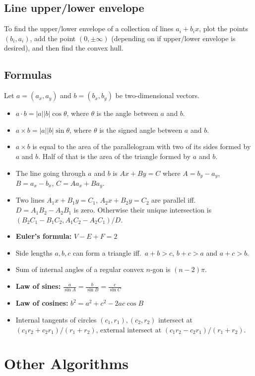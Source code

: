 \documentclass[8pt,a4paper,landscape,oneside]{amsart}
\begin{document}
\begin{multicols*}{3}
  \subsection{Line upper/lower envelope}
    To find the upper/lower envelope of a collection of lines $a_i+b_i x$,
    plot the points $(b_i,a_i)$, add the point $(0,\pm \infty)$ (depending
    on if upper/lower envelope is desired), and then find the convex hull.
  \subsection{Formulas}
    Let $a = (a_x, a_y)$ and $b = (b_x, b_y)$ be two-dimensional vectors.
    \begin{itemize}
      \item $a\cdot b = |a||b|\cos{\theta}$, where $\theta$ is the angle
        between $a$ and $b$.
      \item $a\times b = |a||b|\sin{\theta}$, where $\theta$ is the
        signed angle between $a$ and $b$.
      \item $a\times b$ is equal to the area of the parallelogram with
        two of its sides formed by $a$ and $b$. Half of that is the
        area of the triangle formed by $a$ and $b$.
      \item The line going through $a$ and $b$ is $Ax+By=C$ where $A=b_y-a_y$, $B=a_x-b_x$, $C=Aa_x+Ba_y$.
      \item Two lines $A_1x+B_1y=C_1$, $A_2x+B_2y=C_2$ are parallel iff.\ $D=A_1B_2-A_2B_1$ is zero. Otherwise their unique intersection is $(B_2C_1-B_1C_2,A_1C_2-A_2C_1)/D$.
      \item \textbf{Euler's formula:} $V - E + F = 2$
      \item Side lengths $a,b,c$ can form a triangle iff.\ $a+b>c$, $b+c>a$ and $a+c>b$.
      \item Sum of internal angles of a regular convex $n$-gon is $(n-2)\pi$.
      \item \textbf{Law of sines:} $\frac{a}{\sin A} = \frac{b}{\sin B} = \frac{c}{\sin C}$
      \item \textbf{Law of cosines:} $b^2 = a^2 + c^2 - 2ac\cos B$
      \item Internal tangents of circles $(c_1,r_1), (c_2,r_2)$ intersect at $(c_1r_2+c_2r_1)/(r_1+r_2)$, external intersect at $(c_1r_2-c_2r_1)/(r_1+r_2)$.
    \end{itemize}
\section{Other Algorithms}

\end{multicols*}
\end{document}
